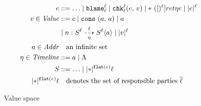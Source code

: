 \documentclass[preprint,onecolumn,9pt]{sigplanconf} %
\begin{document}
\begin{figure}
\begin{align*}
  e &::= \ldots
   \mid {\tt blame}^{\ell}_{\ell}
   \mid {\tt chk}{^{\ell}_{\ell}}({e,\, v})
   \mid {\tt *}{\ }({[})^{\ell}]{ret}{\eta}{e}
   \mid \lvert e\rvert^{\ell}
  \\
  v \in \mathit{Value} &::=
        c
   \mid {\tt \tt cons}{\ }({a,\, a})  
   \mid a \\
&  \mid n : S^{\ell} \overset{\ell}{\underset{\eta}{\dashrightarrow}} S^{\ell} \langle a\rangle
   \mid \lvert v\rvert^{\ell}
  \\
  a \in \mathit{Addr} &\quad\text{an infinite set} \\
  \eta \in \mathit{Timeline} &::= a \mid \Lambda
  \\
  S &::= \ldots
   \mid \lvert*\rvert^{{\tt flat}(e)}{\ell}
  \\
  \lvert*\rvert^{{\tt flat}(e)}{\ell} &\quad\text{denotes the set of responsible parties $\overline{\ell}$}
\end{align*}
\caption{Value space}
\label{fig:values}
\end{figure}
\end{document}
